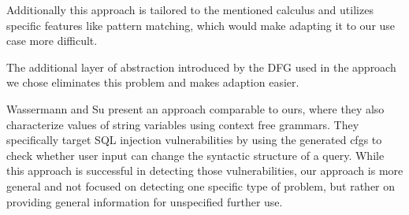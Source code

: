 Additionally this approach is tailored to the mentioned calculus and utilizes specific features like pattern matching, which would make adapting it to our use case more difficult.

The additional layer of abstraction introduced by the DFG used in the approach we chose eliminates this problem and makes adaption easier.


Wassermann and Su \cite{sqli_wassermann_su} present an approach comparable to ours, where they also characterize values of string variables using context free grammars. They specifically target SQL injection vulnerabilities by using the generated \acp{cfg} to check whether user input can change the syntactic structure of a query. While this approach is successful in detecting those vulnerabilities, our approach is more general and not focused on detecting one specific type of problem, but rather on providing general information for unspecified further use.